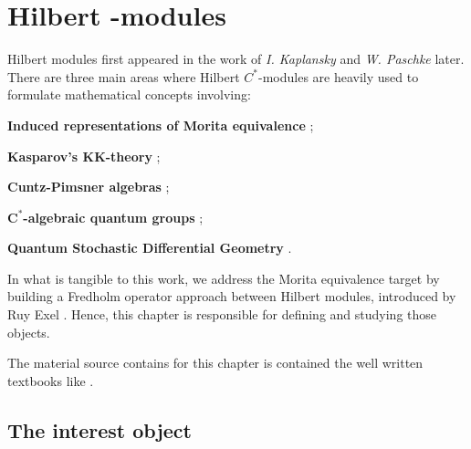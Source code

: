 \chapter[Hilbert \texorpdfstring{\ensuremath{C^*}}{C*}-modules]{Hilbert \texorpdfstring{}{C*}-modules}
\label{ch:hilbert modules}

Hilbert modules first appeared in the work of \textit{I. Kaplansky} \cite{kaplansky1953modules} and \textit{W. Paschke} \cite{paschke1973inner} later. There are three main areas where Hilbert $C^*$-modules are heavily used to formulate mathematical concepts involving:
\begin{itroman}
    \item\label{main areas (i)} \textbf{Induced representations of Morita equivalence} \cite{brown1977stable, RIEFFEL1974176,rieffel1981c};
    \item \textbf{Kasparov's $\mathbf{KK}$-theory} \cite{kasparov1980stinespring};
    
    \item \textbf{Cuntz-Pimsner algebras} \cite{Schafhauser2015CuntzPimsner, robertson2011extensions, browlowe2004exel}; %
    \item \textbf{$\mathbf{C^*}$-algebraic quantum groups} \cite{woronowicz1991unbounded, abadie1996hilbert};
    \item \textbf{Quantum Stochastic Differential Geometry} \cite{applebaum1988quantum}.
\end{itroman}

In what is tangible to this work, we address the Morita equivalence target by building a Fredholm operator approach between Hilbert modules, introduced by Ruy Exel \cite{exel7fredholm}. Hence, this chapter is responsible for defining and studying those objects.

The material source contains for this chapter is contained the well written textbooks like \cite{lance1995hilbert,jensen2012elements, manuilov2001hilbert}.

\section{The interest object}
\label{sec:definicao de hilbert c-star-modules}

